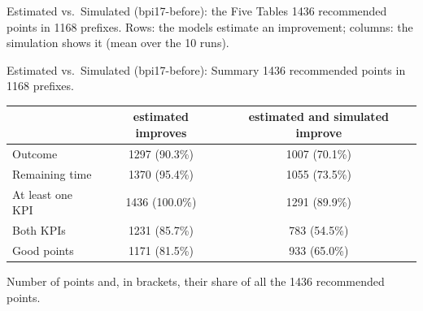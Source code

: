 \documentclass[aspectratio=169]{beamer} %
\begin{document}
\begin{frame}{Estimated vs.\ Simulated (bpi17-before): the Five Tables}
  \footnotesize
  1436 recommended points in 1168 prefixes. Rows: the models estimate an improvement; columns: the
  simulation shows it (mean over the 10 runs).
  \par\vspace{0.3cm}\noindent
  \hfill
  \hfill
  \par\vspace{0.5cm}\noindent\hspace*{\fill}%
  \hspace{0.08\textwidth}%
  \hspace*{\fill}
\end{frame}

\begin{frame}{Estimated vs.\ Simulated (bpi17-before): Summary}
  \footnotesize\setlength{\aboverulesep}{0pt}\setlength{\belowrulesep}{1pt}
  1436 recommended points in 1168 prefixes.
  \begin{center}\setlength{\tabcolsep}{6pt}
  \begin{tabular}{lcc}
    \toprule
     & estimated improves & estimated and simulated improve \\
    \midrule
    Outcome & 1297 (90.3\%) & 1007 (70.1\%) \\
    Remaining time & 1370 (95.4\%) & 1055 (73.5\%) \\
    At least one KPI & 1436 (100.0\%) & 1291 (89.9\%) \\
    Both KPIs & 1231 (85.7\%) & 783 (54.5\%) \\
    Good points & 1171 (81.5\%) & 933 (65.0\%) \\
    \bottomrule
  \end{tabular}
  \end{center}
  {\scriptsize Number of points and, in brackets, their share of all the 1436 recommended points.}
\end{frame}
\end{document}

